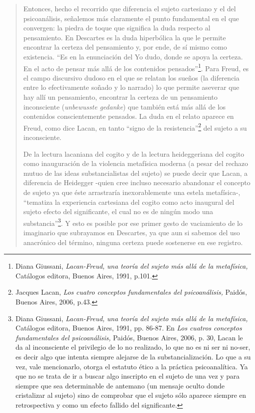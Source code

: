 \begin{quote}
Entonces, hecho el recorrido que diferencia el sujeto cartesiano y el del psicoanálisis, señalemos más claramente el punto fundamental en el que convergen: la piedra de toque que significa la duda respecto al pensamiento. En Descartes es la duda hiperbólica la que le permite encontrar la certeza del pensamiento y, por ende, de sí mismo como existencia. \enquote{Es en la enunciación del Yo dudo, donde se apoya la certeza. En el acto de pensar más allá de los contenidos pensados}\footnote{Diana Giussani, \emph{Lacan-Freud,} \emph{una teoría del sujeto más allá de la metafísica,} Catálogos editora, Buenos Aires, 1991, p.101.}. Para Freud, es el campo discursivo dudoso en el que se relatan los sueños (la diferencia entre lo efectivamente soñado y lo narrado) lo que permite aseverar que hay allí un pensamiento, encontrar la certeza de un pensamiento inconsciente (\emph{unbewusste gedanke}) que también está más allá de los contenidos conscientemente pensados. La duda en el relato aparece en Freud, como dice Lacan, en tanto \enquote{signo de la resistencia}\footnote{Jacques Lacan, \emph{Los cuatro conceptos fundamentales del psicoanálisis,} Paidós, Buenos Aires, 2006, p.43.} del sujeto a su inconsciente.

De la lectura lacaniana del cogito y de la lectura heideggeriana del cogito como inauguración de la violencia metafísica moderna (a pesar del rechazo mutuo de las ideas substancialistas del sujeto) se puede decir que Lacan, a diferencia de Heidegger -quien cree incluso necesario abandonar el concepto de sujeto ya que éste arrastraría inexorablemente una estela metafísica-, \enquote{tematiza la experiencia cartesiana del cogito como acto inaugural del sujeto efecto del significante, el cual no es de ningún modo una substancia}\footnote{Diana Giussani, \emph{Lacan-Freud,} \emph{una teoría del sujeto más allá de la metafísica,} Catálogos editora, Buenos Aires, 1991, pp. 86-87. En \emph{Los cuatros conceptos fundamentales del psicoanálisis,} Paidós, Buenos Aires, 2006, p. 30, Lacan le da al inconsciente el privilegio de lo no realizado, lo que no es ni ser ni no-ser, es decir algo que intenta siempre alejarse de la substancialización. Lo que a su vez, vale mencionarlo, otorga el estatuto ético a la práctica psicoanalítica. Ya que no se trata de ir a buscar algo inscripto en el sujeto de una vez y para siempre que sea determinable de antemano (un mensaje oculto donde cristalizar al sujeto) sino de comprobar que el sujeto sólo aparece siempre en retrospectiva y como un efecto fallido del significante.}. Y esto es posible por ese primer gesto de vaciamiento de lo imaginario que subrayamos en Descartes, ya que aun si sabemos del uso anacrónico del término, ninguna certeza puede sostenerse en ese registro.


\end{quote}
